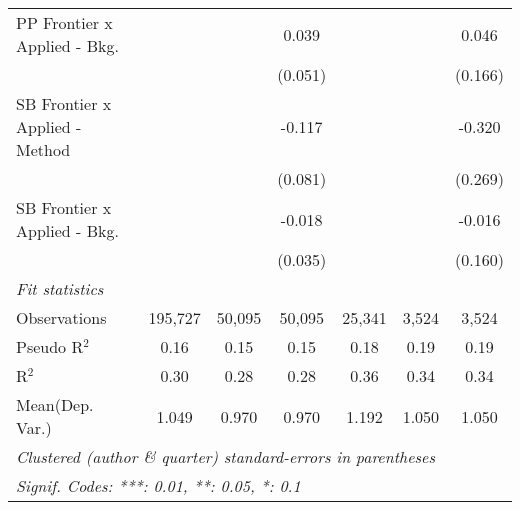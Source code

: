 \begin{tabular}{lcccccc}
   PP Frontier x Applied - Bkg.   &               &         & 0.039         &              &         & 0.046\\   
                                  &               &         & (0.051)       &              &         & (0.166)\\   
   SB Frontier x Applied - Method &               &         & -0.117        &              &         & -0.320\\   
                                  &               &         & (0.081)       &              &         & (0.269)\\   
   SB Frontier x Applied - Bkg.   &               &         & -0.018        &              &         & -0.016\\   
                                  &               &         & (0.035)       &              &         & (0.160)\\   
   \midrule
   \emph{Fit statistics}\\
   Observations                   & 195,727       & 50,095  & 50,095        & 25,341       & 3,524   & 3,524\\  
   Pseudo R$^2$                   & 0.16          & 0.15    & 0.15          & 0.18         & 0.19    & 0.19\\  
   R$^2$                          & 0.30          & 0.28    & 0.28          & 0.36         & 0.34    & 0.34\\  
Mean(Dep. Var.) & 1.049 & 0.970 & 0.970 & 1.192 & 1.050 & 1.050 \\
   \midrule \midrule
   \multicolumn{7}{l}{\emph{Clustered (author \& quarter) standard-errors in parentheses}}\\
   \multicolumn{7}{l}{\emph{Signif. Codes: ***: 0.01, **: 0.05, *: 0.1}}\\
\end{tabular}
\par\endgroup
